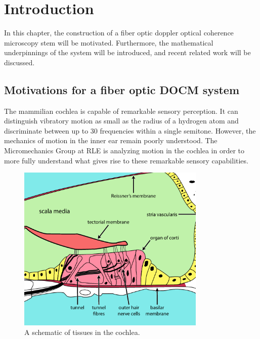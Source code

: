 \chapter{Introduction}

In this chapter, the construction of a fiber optic doppler optical coherence microscopy stem will be motivated. Furthermore, the mathematical underpinnings of the system will be introduced, and recent related work will be discussed.

\section{Motivations for a fiber optic DOCM system}

\label{sec:intro}

The mammilian cochlea is capable of remarkable sensory perception. It can distinguish vibratory motion as small as the radius of a hydrogen atom and discriminate between up to 30 frequencies within a single semitone. \cite{ghafarri} However, the mechanics of motion in the inner ear remain poorly understood. The Micromechanics Group at RLE is  analyzing motion in the cochlea in order to more fully understand what gives rise to these remarkable sensory capabilities.

\begin{figure}[h!]
  \centering
    \includegraphics[width=0.8\textwidth]{Images/Background/cochlea.png}
      \caption{A schematic of tissues in the cochlea.}
      \label{fig:cochlea}
\end{figure}

